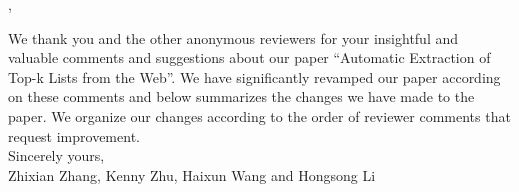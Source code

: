 \documentclass[11pt]{article}
\begin{document}
,
\vspace*{5mm}

We thank you and the other anonymous reviewers for your insightful and
valuable comments and suggestions about our paper ``Automatic Extraction of
Top-k Lists from the Web''. We have significantly revamped our paper
according on these comments and below summarizes the changes we have made to
the paper. We organize our changes according to the order of reviewer
comments that request improvement.
\\

\noindent
Sincerely yours,\\

\noindent
Zhixian Zhang, Kenny Zhu, Haixun Wang and Hongsong Li

\vspace*{0.5cm}
\end{document}
